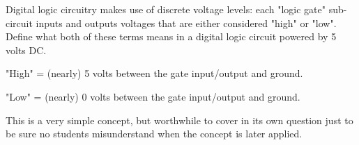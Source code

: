 

Digital logic circuitry makes use of discrete voltage levels: each "logic gate" sub-circuit inputs and outputs voltages that are either considered "high" or "low".  Define what both of these terms means in a digital logic circuit powered by 5 volts DC.







"High" = (nearly) 5 volts between the gate input/output and ground.

\vskip 10pt

"Low" = (nearly) 0 volts between the gate input/output and ground.







This is a very simple concept, but worthwhile to cover in its own question just to be sure no students misunderstand when the concept is later applied.




